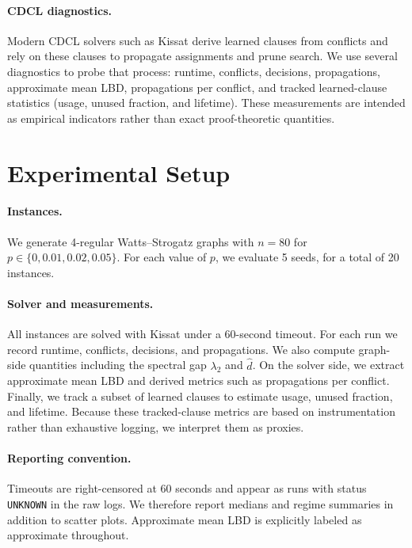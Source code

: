 \documentclass[11pt]{article}
\begin{document}
\paragraph{CDCL diagnostics.}
Modern CDCL solvers such as Kissat derive learned clauses from conflicts and rely on these clauses to propagate assignments and prune search. We use several diagnostics to probe that process: runtime, conflicts, decisions, propagations, approximate mean LBD, propagations per conflict, and tracked learned-clause statistics (usage, unused fraction, and lifetime). These measurements are intended as empirical indicators rather than exact proof-theoretic quantities.

\section{Experimental Setup}

\paragraph{Instances.}
We generate 4-regular Watts--Strogatz graphs with $n=80$ for $p \in \{0, 0.01, 0.02, 0.05\}$. For each value of $p$, we evaluate 5 seeds, for a total of 20 instances.

\paragraph{Solver and measurements.}
All instances are solved with Kissat under a 60-second timeout. For each run we record runtime, conflicts, decisions, and propagations. We also compute graph-side quantities including the spectral gap $\lambda_2$ and $\hat d$. On the solver side, we extract approximate mean LBD and derived metrics such as propagations per conflict. Finally, we track a subset of learned clauses to estimate usage, unused fraction, and lifetime. Because these tracked-clause metrics are based on instrumentation rather than exhaustive logging, we interpret them as proxies.

\paragraph{Reporting convention.}
Timeouts are right-censored at 60 seconds and appear as runs with status \texttt{UNKNOWN} in the raw logs. 
We therefore report medians and regime summaries in addition to scatter plots. Approximate mean LBD is explicitly labeled as approximate throughout.
\end{document}
